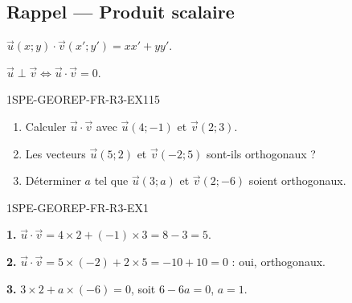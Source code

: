 

\subsection*{Rappel — Produit scalaire}

$\vec{u}(x ; y) \cdot \vec{v}(x' ; y') = xx' + yy'$.

$\vec{u} \perp \vec{v} \iff \vec{u} \cdot \vec{v} = 0$.

\begin{exercice}{1SPE-GEOREP-FR-R3-EX1}{1}{5}
\begin{enumerate}
  \item Calculer $\vec{u} \cdot \vec{v}$ avec $\vec{u}(4 ; -1)$ et $\vec{v}(2 ; 3)$.
  \item Les vecteurs $\vec{u}(5 ; 2)$ et $\vec{v}(-2 ; 5)$ sont-ils orthogonaux ?
  \item Déterminer $a$ tel que $\vec{u}(3 ; a)$ et $\vec{v}(2 ; -6)$ soient orthogonaux.
\end{enumerate}
\end{exercice}


\begin{corrige}{1SPE-GEOREP-FR-R3-EX1}

\textbf{1.} $\vec{u} \cdot \vec{v} = 4 \times 2 + (-1) \times 3 = 8 - 3 = 5$.

\textbf{2.} $\vec{u} \cdot \vec{v} = 5 \times (-2) + 2 \times 5 = -10 + 10 = 0$ : oui, orthogonaux.

\textbf{3.} $3 \times 2 + a \times (-6) = 0$, soit $6 - 6a = 0$, $a = 1$.

\end{corrige}
